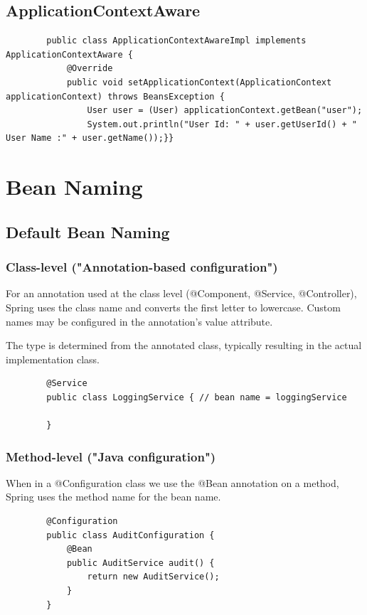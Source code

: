 \documentclass{scrartcl}
\begin{document}
\subsection{ApplicationContextAware}
    \begin{lstlisting}
        public class ApplicationContextAwareImpl implements ApplicationContextAware {
            @Override
            public void setApplicationContext(ApplicationContext applicationContext) throws BeansException {
                User user = (User) applicationContext.getBean("user");
                System.out.println("User Id: " + user.getUserId() + " User Name :" + user.getName());}}
    \end{lstlisting}


\section{Bean Naming}
\label{sec:bean-naming}
\subsection{Default Bean Naming}
\subsubsection{Class-level ("Annotation-based configuration")}
For an annotation used at the class level (@Component, @Service, @Controller), Spring uses the class name and converts the first letter to lowercase.
Custom names may be configured in the annotation's value attribute.

The type is determined from the annotated class, typically resulting in the actual
implementation class.

    \begin{lstlisting}
        @Service
        public class LoggingService { // bean name = loggingService

        }
    \end{lstlisting}

\subsubsection{Method-level ("Java configuration")}
When in a @Configuration class we use the @Bean annotation on a method, Spring uses the method name for the bean name.

    \begin{lstlisting}
        @Configuration
        public class AuditConfiguration {
            @Bean
            public AuditService audit() {
                return new AuditService();
            }
        }
    \end{lstlisting}
\end{document}
